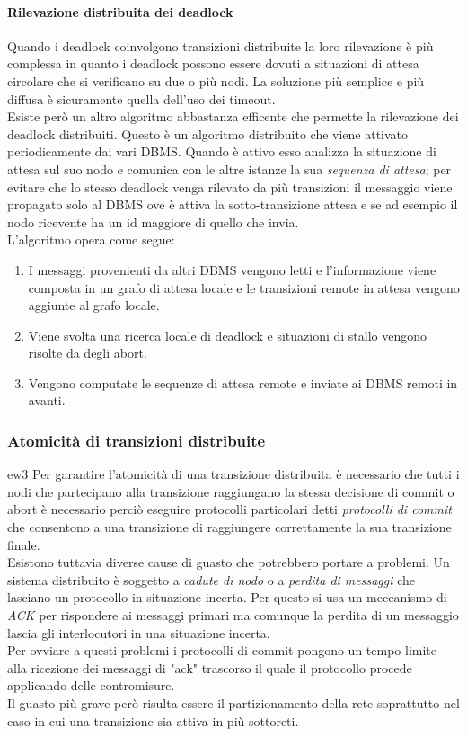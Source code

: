 \paragraph{Rilevazione distribuita dei deadlock} Quando i deadlock coinvolgono transizioni distribuite la loro rilevazione è più complessa  in quanto i deadlock possono essere dovuti a situazioni di attesa circolare che si verificano su due o più nodi. La soluzione più semplice e più diffusa è sicuramente quella dell'uso dei timeout.\\
Esiste però un altro algoritmo abbastanza efficente che permette la rilevazione dei deadlock distribuiti. Questo è un algoritmo distribuito che viene attivato periodicamente dai vari DBMS. Quando è attivo esso analizza la situazione di attesa sul suo nodo e comunica con le altre istanze la sua \emph{sequenza di attesa}; per evitare che lo stesso deadlock venga rilevato da più transizioni il messaggio viene propagato solo al DBMS ove è attiva la sotto-transizione attesa e se ad esempio il nodo ricevente ha un id maggiore di quello che invia.\\
L'algoritmo opera come segue:
\begin{enumerate}
\item I messaggi provenienti da altri DBMS vengono letti e l'informazione viene composta in un grafo di attesa locale e le transizioni remote in attesa vengono aggiunte al grafo locale.
\item Viene svolta una ricerca locale di deadlock e situazioni di stallo vengono risolte da degli abort.
\item Vengono computate le sequenze di attesa remote e inviate ai DBMS remoti in avanti.
\end{enumerate}
\subsubsection{Atomicità di transizioni distribuite}ew3
Per garantire l'atomicità di una transizione distribuita è necessario che tutti i nodi che partecipano alla transizione raggiungano la stessa decisione di commit o abort è necessario perciò eseguire protocolli particolari detti \emph{protocolli di commit} che consentono a una transizione di raggiungere correttamente la sua transizione finale.\\
Esistono tuttavia diverse cause di guasto che potrebbero portare a problemi. Un sistema distribuito è soggetto a \emph{cadute di nodo} o a \emph{perdita di messaggi} che lasciano un protocollo in situazione incerta. Per questo si usa un meccanismo di \emph{ACK} per rispondere ai messaggi primari ma comunque la perdita di un messaggio lascia gli interlocutori in una situazione incerta.\\
Per ovviare a questi problemi i protocolli di commit pongono un tempo limite alla ricezione dei messaggi di "ack" trascorso il quale il protocollo procede applicando delle contromisure.\\
Il guasto più grave però risulta essere il partizionamento della rete soprattutto nel caso in cui una transizione sia attiva in più sottoreti.

